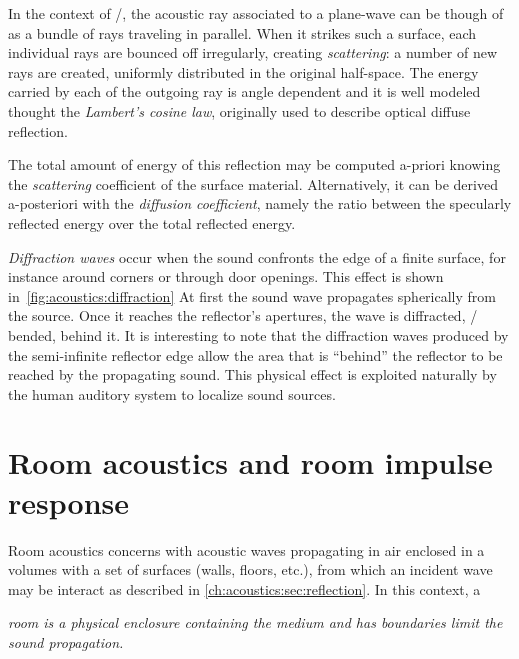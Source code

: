 In the context of \GA/, the acoustic ray associated to a plane-wave can be though of as a bundle of rays traveling in parallel.
When it strikes such a surface, each individual rays are bounced off irregularly, creating \textit{scattering}:
a number of new rays are created, uniformly distributed in the original half-space.
The energy carried by each of the outgoing ray is angle dependent and it
is well modeled thought the \textit{Lambert's cosine law}, originally used to describe optical diffuse reflection.

The total amount of energy of this reflection may be computed a-priori
knowing the \textit{scattering} coefficient of the surface material.
Alternatively, it can be derived a-posteriori with the \textit{diffusion coefficient}, namely the ratio between
the specularly reflected energy over the total reflected energy.

\textit{Diffraction waves} occur when the sound confronts the edge of a finite surface, for instance around corners or through door openings.
This effect is shown in~\cref{fig:acoustics:diffraction}
At first the sound wave propagates spherically from the source.
Once it reaches the reflector's  apertures, the wave is diffracted, \ie/ bended, behind it.
It is interesting to note that the diffraction waves produced by the semi-infinite reflector edge
allow the area that is ``behind'' the reflector to be reached by the propagating sound.
This physical effect is exploited naturally by the human auditory system to localize sound sources.


\section{Room acoustics and room impulse response}\label{ch:acoustics:sec:rir}
Room acoustics concerns with acoustic waves propagating in air enclosed in a volumes with a set of surfaces
(walls, floors, etc.), from which an incident wave may be interact as described in \cref{ch:acoustics:sec:reflection}.
In this context, a
\begin{center}
    \textit{\emph{room} is a physical enclosure containing the medium and has boundaries limit the sound propagation.}
\end{center}

